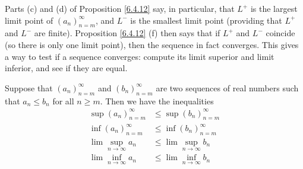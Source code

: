 \begin{note}
Parts (c) and (d) of Proposition \ref{6.4.12} say, in particular, that \(L^+\) is the largest limit point of \((a_n)_{n = m}^\infty\), and \(L^-\) is the smallest limit point
(providing that \(L^+\) and \(L^-\) are finite).
Proposition \ref{6.4.12} (f) then says that if \(L^+\) and \(L^-\) coincide (so there is only one limit point), then the sequence in fact converges.
This gives a way to test if a sequence converges: compute its limit superior and limit inferior, and see if they are equal.
\end{note}

\begin{lemma}\label{6.4.13}
Suppose that \((a_n)_{n = m}^\infty\) and \((b_n)_{n = m}^\infty\) are two sequences of real numbers such that \(a_n \leq b_n\) for all \(n \geq m\).
Then we have the inequalities
\begin{align*}
\sup(a_n)_{n = m}^\infty &\leq \sup(b_n)_{n = m}^\infty \\
\inf(a_n)_{n = m}^\infty &\leq \inf(b_n)_{n = m}^\infty \\
\lim\sup_{n \to \infty} a_n &\leq \lim\sup_{n \to \infty} b_n \\
\lim\inf_{n \to \infty} a_n &\leq \lim\inf_{n \to \infty} b_n
\end{align*}
\end{lemma}


